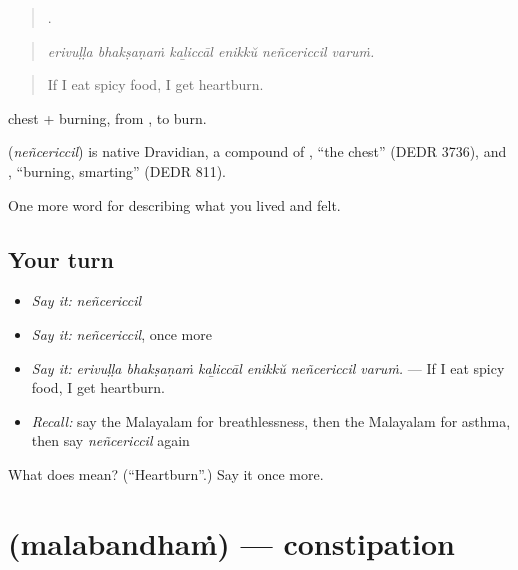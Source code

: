 \begin{quote}
     .
\end{quote}

\begin{quote}
\emph{erivuḷḷa bhakṣaṇaṁ kaḻiccāl enikkŭ neñcericcil varuṁ.}
\end{quote}

\begin{quote}
If I eat spicy food, I get heartburn.
\end{quote}

 chest +  burning, from , to burn.

\begin{cousinweb}
\textbf{} (\emph{neñcericcil}) is native Dravidian, a compound of , \textquotedblleft{}the chest\textquotedblright{} (DEDR 3736), and , \textquotedblleft{}burning, smarting\textquotedblright{} (DEDR 811).
\end{cousinweb}

\begin{grammarlens}[title={What you've built}]
One more word for describing what you lived and felt.
\end{grammarlens}

\subsection*{Your turn}
\begin{itemize}
\raggedright
  \item \emph{Say it:} \emph{neñcericcil}
  \item \emph{Say it:} \emph{neñcericcil}, once more
  \item \emph{Say it:} \emph{erivuḷḷa bhakṣaṇaṁ kaḻiccāl enikkŭ neñcericcil varuṁ.} — If I eat spicy food, I get heartburn.
  \item \emph{Recall:} say the Malayalam for breathlessness, then the Malayalam for asthma, then say \emph{neñcericcil} again
\end{itemize}

\begin{tcolorbox}[breakable,colback=teal!4,colframe=teal!35!black,title={Before you move on}]
What does  mean? (\textquotedblleft{}Heartburn\textquotedblright{}.) Say it once more.
\end{tcolorbox}
\section[\texorpdfstring{\ml{മലബന്ധം} (malabandhaṁ)}{മലബന്ധം (malabandhaṁ)}]{ (malabandhaṁ) — constipation}

